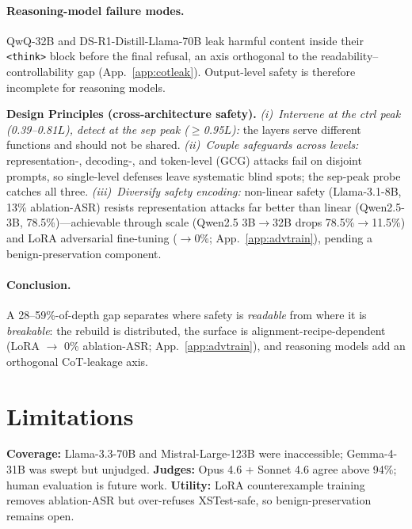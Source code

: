 \documentclass{article}
\begin{document}
\paragraph{Reasoning-model failure modes.}
QwQ-32B and DS-R1-Distill-Llama-70B leak harmful content inside their \texttt{<think>} block before the final refusal, an axis orthogonal to the readability--controllability gap (App.~\ref{app:cotleak}). Output-level safety is therefore incomplete for reasoning models.

\par\medskip
\noindent\colorbox{gapshade}{%
  \begin{minipage}{\dimexpr\linewidth-2\fboxsep\relax}
  \small
  \textcolor{accent}{\textbf{Design Principles (cross-architecture safety).}}
  \emph{(i)~Intervene at the ctrl peak (0.39--0.81$L$), detect at the sep peak ($\geq$0.95$L$):} the layers serve different functions and should not be shared. \emph{(ii)~Couple safeguards across levels:} representation-, decoding-, and token-level (GCG) attacks fail on disjoint prompts, so single-level defenses leave systematic blind spots; the sep-peak probe catches all three. \emph{(iii)~Diversify safety encoding:} non-linear safety (Llama-3.1-8B, 13\% ablation-ASR) resists representation attacks far better than linear (Qwen2.5-3B, 78.5\%)---achievable through scale (Qwen2.5 3B$\to$32B drops 78.5\%$\to$11.5\%) and LoRA adversarial fine-tuning ($\to$0\%; App.~\ref{app:advtrain}), pending a benign-preservation component.
  \end{minipage}%
}\par\medskip

\paragraph{Conclusion.}
A 28--59\%-of-depth gap separates where safety is \emph{readable} from where it is \emph{breakable}: the rebuild is distributed, the surface is alignment-recipe-dependent (LoRA $\to$ 0\% ablation-ASR; App.~\ref{app:advtrain}), and reasoning models add an orthogonal CoT-leakage axis.

\section*{Limitations}
\textbf{Coverage:} Llama-3.3-70B and Mistral-Large-123B were inaccessible; Gemma-4-31B was swept but unjudged. \textbf{Judges:} Opus 4.6 + Sonnet 4.6 agree above 94\%; human evaluation is future work. \textbf{Utility:} LoRA counterexample training removes ablation-ASR but over-refuses XSTest-safe, so benign-preservation remains open.
\end{document}
